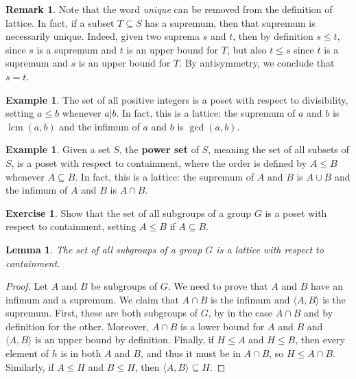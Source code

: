 \documentclass[12pt]{report}
\newtheorem{lemma}[theorem]{Lemma}
\numberwithin{equation}{section}
\numberwithin{theorem}{chapter}
\theoremstyle{definition}
\newtheorem{example}[theorem]{Example}
\newtheorem{exercise}{Exercise}
\newtheorem*{basic properties}{Basic Properties}
\newtheorem*{Important Remark}{Important Remark}
\newtheorem{remark}[theorem]{Remark}
\newcommand{\df}[1]{{\bf #1}\index{#1}}
\DeclareMathOperator{\lcm}{lcm}
\begin{document}
\begin{remark}
	Note that the word \emph{unique} can be removed from the definition of lattice. In fact, if a subset $T \subseteq S$ has a supremum, then that supremum is necessarily unique. Indeed, given two suprema $s$ and $t$, then by definition $s \leq t$, since $s$ is a supremum and $t$ is an upper bound for $T$, but also $t \leq s$ since $t$ is a supremum and $s$ is an upper bound for $T$. By antisymmetry, we conclude that $s=t$.
\end{remark}



\begin{example}
The set of all positive integers is a poset with respect to divisibility, setting $a\leq b$ whenever $a|b$. In fact, this is a lattice: the supremum of $a$ and $b$ is $\lcm(a,b)$ and the infimum of $a$ and $b$ is $\gcd(a,b)$.
\end{example}


\begin{example}
Given a set $S$, the \df{power set} of $S$, meaning the set of all subsets of $S$, is a poset with respect to containment, where the order is defined by $A\leq B$ whenever $A\subseteq B$. In fact, this is a lattice: the supremum of $A$ and $B$ is $A\cup B$ and the infimum of $A$ and $B$ is $A\cap B$.
\end{example}


\begin{exercise}
	Show that the set of all subgroups of a group $G$ is a poset with respect to containment, setting $A \leq B$ if $A \subseteq B$.
\end{exercise}

\begin{lemma}
	The set of all subgroups of a group $G$ is a lattice with respect to containment.
\end{lemma}


\begin{proof}
	Let $A$ and $B$ be subgroups of $G$. We need to prove that $A$ and $B$ have an infimum and a supremum. We claim that $A \cap B$ is the infimum and $\langle A, B \rangle$ is the supremum. First, these are both subgroups of $G$, by  in the case $A \cap B$ and by definition for the other. Moreover, $A \cap B$ is a lower bound for $A$ and $B$ and $\langle A, B \rangle$ is an upper bound by definition. Finally, if $H \leq A$ and $H \leq B$, then every element of $h$ is in both $A$ and $B$, and thus it must be in $A \cap B$, so $H \leq A \cap B$. Similarly, if $A \leq H$ and $B \leq H$, then $\langle A, B \rangle \subseteq H$.
\end{proof}
\end{document}

